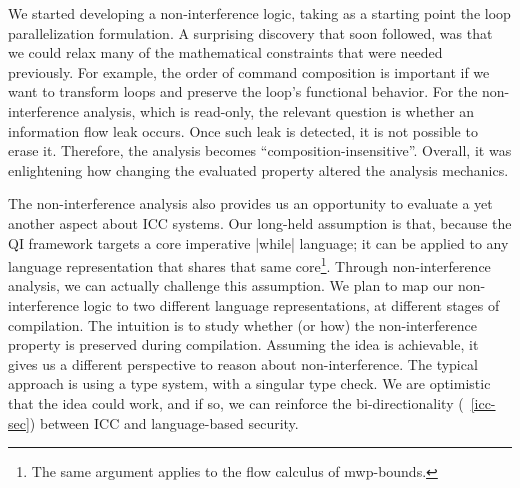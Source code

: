 We started developing a non-interference logic, taking as a starting point the loop parallelization formulation.
A surprising discovery that soon followed, was that we could relax many of the mathematical constraints that were needed previously.
For example, the order of command composition is important if we want to transform loops and preserve the loop's functional behavior.
For the non-interference analysis, which is read-only, the relevant question is whether an information flow leak occurs.
Once such leak is detected, it is not possible to erase it.
Therefore, the analysis becomes \enquote{composition-insensitive}.
Overall, it was enlightening how changing the evaluated property altered the analysis mechanics.

The non-interference analysis also provides us an opportunity to evaluate a yet another aspect about ICC systems.
Our long-held assumption is that, because the QI framework targets a core imperative \pr|while| language;
it can be applied to any language representation that shares that same core\footnote{The same argument applies to the flow calculus of mwp-bounds.}.
Through non-interference analysis, we can actually challenge this assumption.
We plan to map our non-interference logic to two different language representations, at different stages of compilation.
The intuition is to study whether (or how) the non-interference property is preserved during compilation.
Assuming the idea is achievable, it gives us a different perspective to reason about non-interference.
The typical approach is using a type system, with a singular type check.
We are optimistic that the idea could work, and if so,
we can reinforce the bi-directionality (\cf~\autoref{icc-sec}) between ICC and language-based security.


